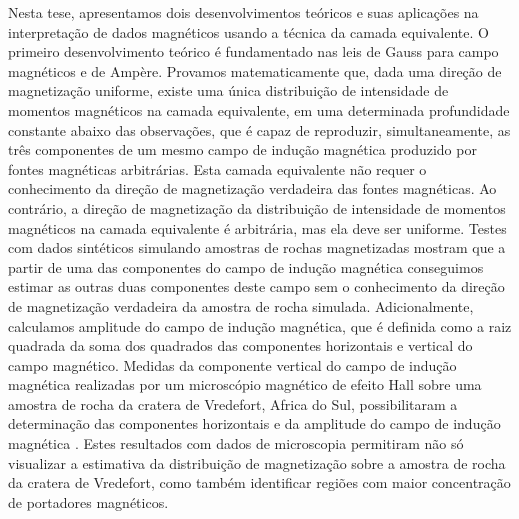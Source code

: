 Nesta tese, apresentamos dois desenvolvimentos teóricos e suas aplicações na interpretação de dados magnéticos 
usando a técnica da camada equivalente. 
O primeiro desenvolvimento teórico é fundamentado nas leis de Gauss para campo magnéticos e de Ampère. 
Provamos matematicamente que, dada uma direção de magnetização uniforme, existe uma única distribuição de 
intensidade de momentos magnéticos na camada equivalente, em uma determinada profundidade constante abaixo 
das observações, que é capaz de reproduzir, simultaneamente, as três componentes de um mesmo campo de indução 
magnética produzido por fontes magnéticas arbitrárias. Esta camada equivalente não requer o conhecimento 
da direção de magnetização verdadeira das fontes magnéticas. Ao contrário, a direção de magnetização da 
distribuição de intensidade de momentos magnéticos na camada equivalente é arbitrária, mas ela deve ser uniforme. 
Testes com dados sintéticos simulando amostras de rochas magnetizadas mostram que a partir de uma das 
componentes do campo de indução magnética conseguimos estimar as outras duas componentes deste campo sem o 
conhecimento da direção de magnetização verdadeira da amostra de rocha simulada. Adicionalmente, calculamos 
amplitude do campo de indução magnética, que é definida como a raiz quadrada da soma dos quadrados das 
componentes horizontais e vertical do campo magnético. Medidas da componente vertical do campo de indução 
magnética realizadas por um microscópio magnético de efeito Hall sobre uma amostra de rocha da cratera de 
Vredefort, Africa do Sul, possibilitaram a determinação das componentes horizontais e da amplitude do campo 
de indução magnética \citep{araujo_etal2019_materials}. 
Estes resultados com dados de microscopia permitiram não só visualizar a estimativa da distribuição de 
magnetização sobre a amostra de rocha da cratera de Vredefort, como também identificar regiões com maior 
concentração de portadores magnéticos.

